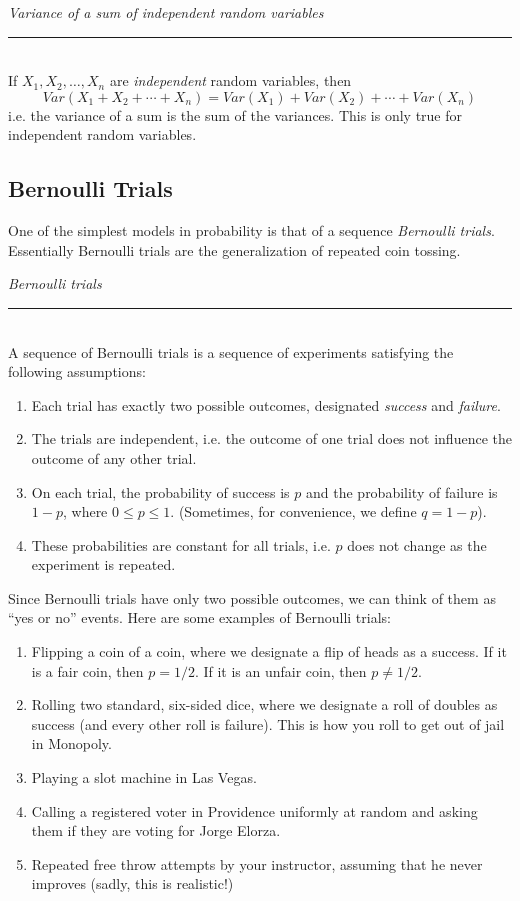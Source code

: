 \documentclass[12pt]{article}
\theoremstyle{definition}
\theoremstyle{remark}
\begin{document}
\begin{framed}
  \emph{Variance of a sum of independent random variables}\\
  \rule{\dimexpr{}\fboxrule}{.1pt} \\
If $X_1, X_2, \dots, X_n$ are \emph{independent} random variables, then
\[
Var(X_1 + X_2 + \cdots + X_n) = Var(X_1) + Var(X_2) + \cdots + Var(X_n)
\]
i.e. the variance of a sum is the sum of the variances. This is only true for independent random variables.
\end{framed}

\subsection{Bernoulli Trials}
One of the simplest models in probability is that of a sequence \emph{Bernoulli trials}. Essentially Bernoulli trials are the generalization of repeated coin tossing. 

\begin{framed}
  \emph{Bernoulli trials}\\
  \rule{\dimexpr{}\fboxrule}{.1pt} \\
A sequence of Bernoulli trials is a sequence of experiments satisfying the following assumptions:
\begin{enumerate}
\item Each trial has exactly two possible outcomes, designated \emph{success} and \emph{failure}.
\item The trials are independent, i.e. the outcome of one trial does not influence the outcome of any other trial.
\item On each trial, the probability of success is $p$ and the probability of failure is $1-p$, where $0 \leq p \leq 1$. (Sometimes, for convenience, we define $q = 1 - p$).
\item These probabilities are constant for all trials, i.e. $p$ does not change as the experiment is repeated.
\end{enumerate}
\end{framed}

Since Bernoulli trials have only two possible outcomes, we can think of them as ``yes or no'' events. Here are some examples of Bernoulli trials:
\begin{enumerate}
\item Flipping a coin of a coin, where we designate a flip of heads as a success. If it is a fair coin, then $p = 1/2$. If it is an unfair coin, then $p \neq 1/2$. 
\item Rolling two standard, six-sided dice, where we designate a roll of doubles as success (and every other roll is failure). This is how you roll to get out of jail in Monopoly.
\item Playing a slot machine in Las Vegas.
\item Calling a registered voter in Providence uniformly at random and asking them if they are voting for Jorge Elorza.
\item Repeated free throw attempts by your instructor, assuming that he never improves (sadly, this is realistic!)
\end{enumerate}
\end{document}
